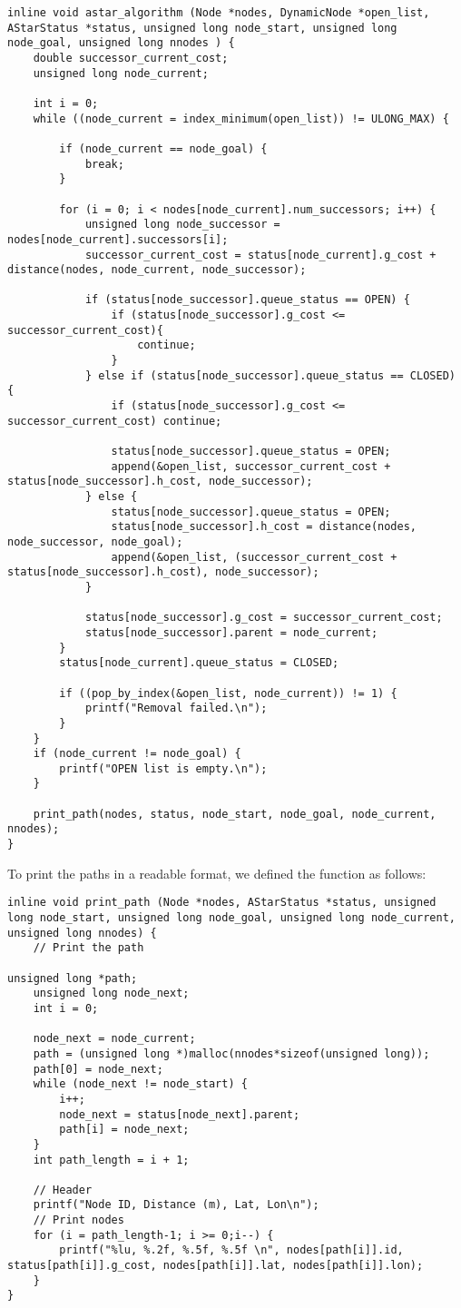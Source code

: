 \begin{lstlisting}
inline void astar_algorithm (Node *nodes, DynamicNode *open_list, AStarStatus *status, unsigned long node_start, unsigned long node_goal, unsigned long nnodes ) {
	double successor_current_cost;
	unsigned long node_current;

	int i = 0;
	while ((node_current = index_minimum(open_list)) != ULONG_MAX) {

		if (node_current == node_goal) {
			break;
		}

		for (i = 0; i < nodes[node_current].num_successors; i++) {
			unsigned long node_successor = nodes[node_current].successors[i];
			successor_current_cost = status[node_current].g_cost + distance(nodes, node_current, node_successor);

			if (status[node_successor].queue_status == OPEN) {
				if (status[node_successor].g_cost <= successor_current_cost){
					continue;
				}
			} else if (status[node_successor].queue_status == CLOSED) {
				if (status[node_successor].g_cost <= successor_current_cost) continue;

				status[node_successor].queue_status = OPEN;
				append(&open_list, successor_current_cost + status[node_successor].h_cost, node_successor);
			} else {
				status[node_successor].queue_status = OPEN;
				status[node_successor].h_cost = distance(nodes, node_successor, node_goal);
				append(&open_list, (successor_current_cost + status[node_successor].h_cost), node_successor);
			}

			status[node_successor].g_cost = successor_current_cost;
			status[node_successor].parent = node_current;
		}
		status[node_current].queue_status = CLOSED;

		if ((pop_by_index(&open_list, node_current)) != 1) {
			printf("Removal failed.\n");
		}
	}
	if (node_current != node_goal) {
		printf("OPEN list is empty.\n");
	}

	print_path(nodes, status, node_start, node_goal, node_current, nnodes);
}
\end{lstlisting}

To print the paths in a readable  format, we defined the function  as follows:
\begin{lstlisting}
inline void print_path (Node *nodes, AStarStatus *status, unsigned long node_start, unsigned long node_goal, unsigned long node_current, unsigned long nnodes) {
	// Print the path

unsigned long *path;
	unsigned long node_next;
	int i = 0;

	node_next = node_current;
	path = (unsigned long *)malloc(nnodes*sizeof(unsigned long));
	path[0] = node_next;
	while (node_next != node_start) {
		i++;
		node_next = status[node_next].parent;
		path[i] = node_next;
	}
	int path_length = i + 1;

	// Header
	printf("Node ID, Distance (m), Lat, Lon\n");
	// Print nodes
	for (i = path_length-1; i >= 0;i--) {
		printf("%lu, %.2f, %.5f, %.5f \n", nodes[path[i]].id, status[path[i]].g_cost, nodes[path[i]].lat, nodes[path[i]].lon);
	}
}
\end{lstlisting}

